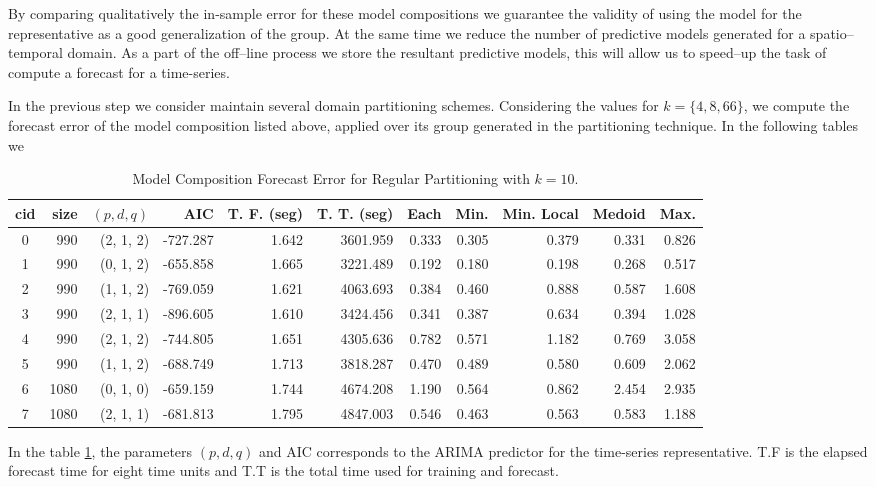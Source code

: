 By comparing qualitatively the in-sample error for these model compositions we guarantee the validity of using the model for the representative as a good generalization of the group. At the same time we reduce the number of predictive models generated for a spatio--temporal domain. As a part of the off--line process we store the resultant predictive models, this will allow us to speed--up the task of compute a forecast for a time-series.

In the previous step we consider maintain several domain partitioning schemes. Considering the values for $k = \{4, 8, 66\}$, we compute the forecast error of the model composition listed above, applied over its group generated in the partitioning technique. In the following tables we 

\begin{table}[h]
	\centering
	\tiny
	\begin{tabular}{|c|r|r|r|r|r|r|r|r|r|r|}
		\hline
		cid & size & $(p, d, q)$ & AIC & T. F. (seg) & T. T. (seg) & Each & Min. & Min. Local & Medoid & Max. \\
		\hline
		0 &  990 & (2, 1, 2) & -727.287 & 1.642 & 3601.959 & 0.333 & 0.305 & 0.379 & 0.331 & 0.826 \\
		1 &  990 & (0, 1, 2) & -655.858 & 1.665 & 3221.489 & 0.192 & 0.180 & 0.198 & 0.268 & 0.517 \\
		2 &  990 & (1, 1, 2) & -769.059 & 1.621 & 4063.693 & 0.384 & 0.460 & 0.888 & 0.587 & 1.608 \\
		3 &  990 & (2, 1, 1) & -896.605 & 1.610 & 3424.456 & 0.341 & 0.387 & 0.634 & 0.394 & 1.028 \\
		4 &  990 & (2, 1, 2) & -744.805 & 1.651 & 4305.636 & 0.782 & 0.571 & 1.182 & 0.769 & 3.058 \\
		5 &  990 & (1, 1, 2) & -688.749 & 1.713 & 3818.287 & 0.470 & 0.489 & 0.580 & 0.609 & 2.062 \\
		6 & 1080 & (0, 1, 0) & -659.159 & 1.744 & 4674.208 & 1.190 & 0.564 & 0.862 & 2.454 & 2.935 \\
		7 & 1080 & (2, 1, 1) & -681.813 & 1.795 & 4847.003 & 0.546 & 0.463 & 0.563 & 0.583 & 1.188 \\ \hline
	\end{tabular}
	\caption{Model Composition Forecast Error for Regular Partitioning with $k=10$.}
	\label{Table:ForecastErrorRegulark10}
\end{table}

In the table \ref{Table:ForecastErrorRegulark10}, the parameters $(p, d, q)$ and  AIC corresponds to the ARIMA predictor for the time-series representative. T.F is the elapsed forecast time for eight time units and T.T is the total time used for training and forecast. 

